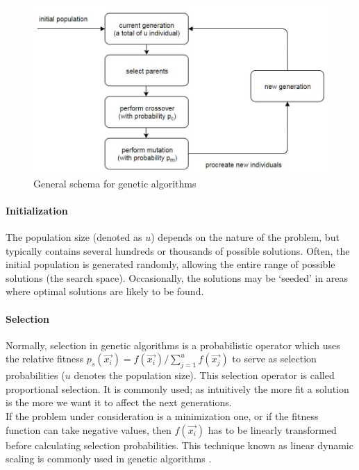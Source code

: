 \documentclass[12pt]{article}
\begin{document}
\begin{figure}[!htbp]
\centering
\includegraphics[width=1\textwidth]{ga}
\caption{General schema for genetic algorithms}
\label{fig:ga}
\end{figure}

\paragraph{Initialization}
The population size (denoted as $u$) depends on the nature of the problem,
but typically contains several hundreds or thousands of possible solutions.
Often, the initial population is generated randomly, allowing the entire range
of possible solutions (the search space).
Occasionally, the solutions may be `seeded' in areas where optimal solutions
are likely to be found.

\paragraph{Selection}
Normally, selection in genetic algorithms is a probabilistic operator
which uses the relative fitness
$ p_s \left( \vec{x_i} \right) = 
f \left( \vec{x_i} \right) / \sum_{j=1}^uf \left( \vec{x_j} \right) $
to serve as selection probabilities ($u$ denotes the population size).
This selection operator is called proportional selection.
It is commonly used; as intuitively the more fit a solution is the more we
want it to affect the next generations.\\
If the problem under consideration is a minimization one,
or if the fitness function can take negative values,
then $ f \left( \vec{x_i} \right) $ has to be
linearly transformed before calculating selection probabilities.
This technique known as linear dynamic scaling is commonly used
in genetic algorithms \cite[pp.~123--124]{goldberg}.
\end{document}
